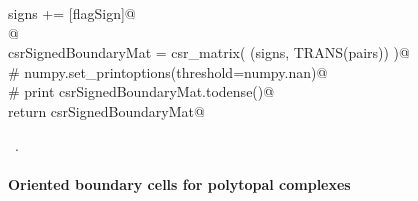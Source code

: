 \documentclass[11pt,oneside]{article}	%
\begin{document}
\begin{flushleft}
\begin{list}{}{}
\mbox{}\verb@      signs += [flagSign]@\\
\mbox{}\verb@   @\\
\mbox{}\verb@   csrSignedBoundaryMat = csr_matrix( (signs, TRANS(pairs)) )@\\
\mbox{}\verb@   # numpy.set_printoptions(threshold=numpy.nan)@\\
\mbox{}\verb@   # print csrSignedBoundaryMat.todense()@\\
\mbox{}\verb@   return csrSignedBoundaryMat@\\
\mbox{}\verb@@{\NWsep}
\end{list}
\vspace{-1ex}
\footnotesize\addtolength{\baselineskip}{-1ex}
\begin{list}{}{\setlength{\itemsep}{-\parsep}\setlength{\itemindent}{-\leftmargin}}
\item \NWtxtMacroRefIn\ .
\end{list}
\end{flushleft}

\paragraph{Oriented boundary cells for polytopal complexes}
\end{document}
